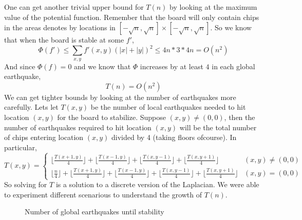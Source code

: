 \documentclass[runningheads,a4paper]{llncs}
\begin{document}
One can get another trivial upper bound for $T(n)$ by looking at the maximum value of the potential function. Remember that the board will only contain chips in the areas denotes by locations in $[-\sqrt{n}, \sqrt{n}] \times [-\sqrt{n}, \sqrt{n}]$. So we know that when the board is stable at some $f'$, 
\[ \Phi(f') \leq \sum_{x,y} f'(x,y)(|x| + |y|)^2 \leq 4n*3*4n = O(n^2) \]
And since $\Phi(f) = 0$ and we know that $\Phi$ increases by at least $4$ in each global earthquake, 
\[ T(n) = O(n^2) \]
We can get tighter bounds by looking at the number of earthquakes more carefully. Lets let $T(x,y)$ be the number of local earthquakes needed to hit location $(x,y)$ for the board to stabilize. Suppose $(x,y) \neq (0,0)$, then the number of earthquakes required to hit location $(x,y)$ will be the total number of chips entering location $(x,y)$ divided by 4 (taking floors ofcourse). In particular,
\[ T(x,y) = \left\{ \begin{array}{cc} \lfloor\frac{T(x+1, y)}{4} \rfloor + \lfloor \frac{T(x-1, y)}{4} \rfloor + \lfloor \frac{T(x, y-1)}{4} \rfloor + \lfloor \frac{T(x, y+1)}{4} \rfloor & (x,y) \neq (0,0) \\
 \lfloor \frac{n}{4} \rfloor  + \lfloor\frac{T(x+1, y)}{4} \rfloor + \lfloor \frac{T(x-1, y)}{4} \rfloor + \lfloor \frac{T(x, y-1)}{4} \rfloor + \lfloor \frac{T(x, y+1)}{4} \rfloor & (x,y) = (0,0) \end{array} \right. \]
So solving for $T$ is a solution to a discrete version of the Laplacian. We were able to experiment different scenarious to understand the growth of $T(n)$. 
\begin{figure}[!ht]
\centering
{} \qquad
{}
\caption{Number of global earthquakes until stability}
\label{fig:growthofT}
\end{figure}
\end{document}
